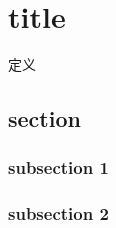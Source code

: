 \chapter{title}

\begin{introduction}
    \item 定义
\end{introduction}

\section{section}

\subsection{subsection 1}

\subsection{subsection 2}

